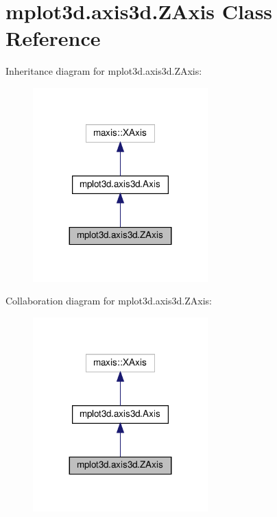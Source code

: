 \hypertarget{classmplot3d_1_1axis3d_1_1ZAxis}{}\section{mplot3d.\+axis3d.\+Z\+Axis Class Reference}
\label{classmplot3d_1_1axis3d_1_1ZAxis}


Inheritance diagram for mplot3d.\+axis3d.\+Z\+Axis\+:
\nopagebreak
\begin{figure}[H]
\begin{center}
\leavevmode
\includegraphics[width=191pt]{classmplot3d_1_1axis3d_1_1ZAxis__inherit__graph}
\end{center}
\end{figure}


Collaboration diagram for mplot3d.\+axis3d.\+Z\+Axis\+:
\nopagebreak
\begin{figure}[H]
\begin{center}
\leavevmode
\includegraphics[width=191pt]{classmplot3d_1_1axis3d_1_1ZAxis__coll__graph}
\end{center}
\end{figure}
